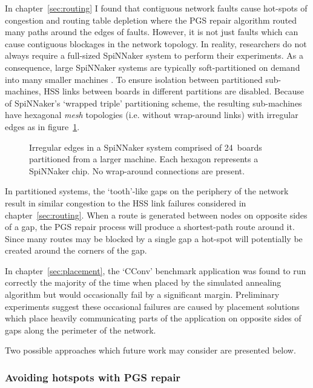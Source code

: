 			In chapter~\ref{sec:routing} I found that contiguous network faults cause
			hot-spots of congestion and routing table depletion where the PGS repair
			algorithm routed many paths around the edges of faults.  However, it is
			not just faults which can cause contiguous blockages in the network
			topology. In reality, researchers do not always require a full-sized
			SpiNNaker system to perform their experiments. As a consequence, large
			SpiNNaker systems are typically soft-partitioned on demand into many
			smaller machines \cite{spalloc16}. To ensure isolation between
			partitioned sub-machines, HSS links between boards in different
			partitions are disabled. Because of SpiNNaker's `wrapped triple'
			partitioning scheme, the resulting sub-machines have hexagonal
			\emph{mesh} topologies (i.e.  without wrap-around links) with irregular
			edges as in figure~\ref{fig:spalloc-mesh}.
			
			\begin{figure}
				\center
				
				\caption{Irregular edges in a SpiNNaker system comprised of 24~boards
				partitioned from a larger machine.  Each hexagon represents a SpiNNaker
				chip. No wrap-around connections are present.}
				\label{fig:spalloc-mesh}
			\end{figure}
			
			In partitioned systems, the `tooth'-like gaps on the periphery of the
			network result in similar congestion to the HSS link failures considered
			in chapter~\ref{sec:routing}. When a route is generated between nodes on
			opposite sides of a gap, the PGS repair process will produce a
			shortest-path route around it. Since many routes may be blocked by a
			single gap a hot-spot will potentially be created around the corners of
			the gap.
			
			In chapter~\ref{sec:placement}, the `CConv' benchmark application was
			found to run correctly the majority of the time when placed by the
			simulated annealing algorithm but would occasionally fail by a
			significant margin. Preliminary experiments suggest these occasional
			failures are caused by placement solutions which place heavily
			communicating parts of the application on opposite sides of gaps along the
			perimeter of the network.
			
			Two possible approaches which future work may consider are presented
			below.
			
			\subsubsection{Avoiding hotspots with PGS repair}
				

